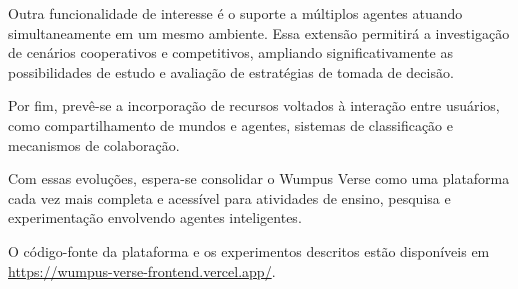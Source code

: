Outra funcionalidade de interesse é o suporte a múltiplos agentes atuando simultaneamente em um mesmo ambiente. Essa extensão permitirá a investigação de cenários cooperativos e competitivos, ampliando significativamente as possibilidades de estudo e avaliação de estratégias de tomada de decisão.

Por fim, prevê-se a incorporação de recursos voltados à interação entre usuários, como compartilhamento de mundos e agentes, sistemas de classificação e mecanismos de colaboração.

Com essas evoluções, espera-se consolidar o Wumpus Verse como uma plataforma cada vez mais completa e acessível para atividades de ensino, pesquisa e experimentação envolvendo agentes inteligentes.

\small O código-fonte da plataforma e os experimentos descritos estão disponíveis em 
\url{https://wumpus-verse-frontend.vercel.app/}.
